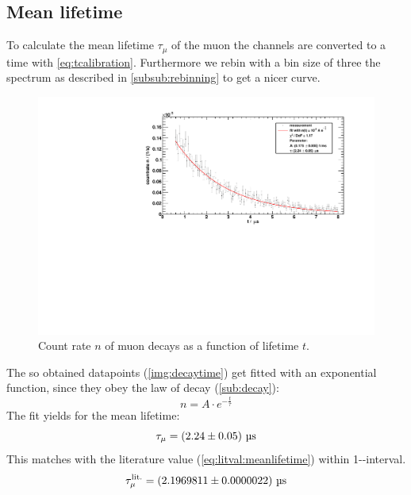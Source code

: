 \subsection{Mean lifetime}
To calculate the mean lifetime $\tau_\mu$ of the muon the channels are converted to a time with \autoref{eq:tcalibration}. 
Furthermore we rebin with a bin size of three the spectrum as described in \ref{subsub:rebinning} to get a nicer curve.
\begin{figure}[H]
\begin{center}
  \includegraphics[width=\textwidth]{../img/decayTime.pdf}
  \caption{Count rate $n$ of muon decays as a function of lifetime $t$.}
  \label{img:decaytime}
\end{center}
\end{figure}

The so obtained datapoints (\autoref{img:decaytime}) get fitted with an exponential function, since they obey the law of decay (\ref{sub:decay}):
\begin{equation}
    n = A \cdot e^{-\frac{t}{\tau}}
\end{equation}
The fit yields for the mean lifetime:
\begin{equation}
	\label{eq:result:meanlifetime}
    \tau_\mu = \left( 2.24 \pm 0.05 \right)\,\text{\textmu s}
\end{equation}
This matches with the literature value (\autoref{eq:litval:meanlifetime}) within 1-\textsigma-interval.
\begin{equation}
    \tau_\mu^{\text{lit.}} = \left( 2.1969811 \pm 0.0000022 \right)\,\text{\textmu s}
\end{equation}


